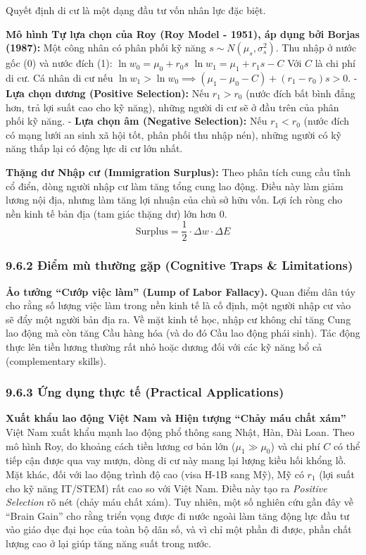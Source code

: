 \documentclass[
]{article}
\begin{document}
Quyết định di cư là một dạng đầu tư vốn nhân lực đặc biệt.

\textbf{Mô hình Tự lựa chọn của Roy (Roy Model - 1951), áp dụng bởi
Borjas (1987):} Một công nhân có phân phối kỹ năng
\(s \sim N(\mu_s, \sigma_s^2)\). Thu nhập ở nước gốc (0) và nước đích
(1): \(\ln w_0 = \mu_0 + r_0 s\) \(\ln w_1 = \mu_1 + r_1 s - C\) Với
\(C\) là chi phí di cư. Cá nhân di cư nếu
\(\ln w_1 > \ln w_0 \implies (\mu_1 - \mu_0 - C) + (r_1 - r_0)s > 0\). -
\textbf{Lựa chọn dương (Positive Selection):} Nếu \(r_1 > r_0\) (nước
đích bất bình đẳng hơn, trả lợi suất cao cho kỹ năng), những người di cư
sẽ ở đầu trên của phân phối kỹ năng. - \textbf{Lựa chọn âm (Negative
Selection):} Nếu \(r_1 < r_0\) (nước đích có mạng lưới an sinh xã hội
tốt, phân phối thu nhập nén), những người có kỹ năng thấp lại có động
lực di cư lớn nhất.

\textbf{Thặng dư Nhập cư (Immigration Surplus):} Theo phân tích cung cầu
tĩnh cổ điển, dòng người nhập cư làm tăng tổng cung lao động. Điều này
làm giảm lương nội địa, nhưng làm tăng lợi nhuận của chủ sở hữu vốn. Lợi
ích ròng cho nền kinh tế bản địa (tam giác thặng dư) lớn hơn 0.
\[ \text{Surplus} = \frac{1}{2} \cdot \Delta w \cdot \Delta E \]

\subsubsection{9.6.2 Điểm mù thường gặp (Cognitive Traps \&
Limitations)}\label{ux111iux1ec3m-muxf9-thux1b0ux1eddng-gux1eb7p-cognitive-traps-limitations-74}

\textbf{Ảo tưởng ``Cướp việc làm'' (Lump of Labor Fallacy).} Quan điểm
dân túy cho rằng số lượng việc làm trong nền kinh tế là cố định, một
người nhập cư vào sẽ đẩy một người bản địa ra. Về mặt kinh tế học, nhập
cư không chỉ tăng Cung lao động mà còn tăng Cầu hàng hóa (và do đó Cầu
lao động phái sinh). Tác động thực lên tiền lương thường rất nhỏ hoặc
dương đối với các kỹ năng bổ cả (complementary skills).

\subsubsection{9.6.3 Ứng dụng thực tế (Practical
Applications)}\label{ux1ee9ng-dux1ee5ng-thux1ef1c-tux1ebf-practical-applications-38}

\textbf{Xuất khẩu lao động Việt Nam và Hiện tượng ``Chảy máu chất xám''}
Việt Nam xuất khẩu mạnh lao động phổ thông sang Nhật, Hàn, Đài Loan.
Theo mô hình Roy, do khoảng cách tiền lương cơ bản lớn
(\(\mu_1 \gg \mu_0\)) và chi phí \(C\) có thể tiếp cận được qua vay
mượn, dòng di cư này mang lại lượng kiều hối khổng lồ. Mặt khác, đối với
lao động trình độ cao (visa H-1B sang Mỹ), Mỹ có \(r_1\) (lợi suất cho
kỹ năng IT/STEM) rất cao so với Việt Nam. Điều này tạo ra \emph{Positive
Selection} rõ nét (chảy máu chất xám). Tuy nhiên, một số nghiên cứu gần
đây về ``Brain Gain'' cho rằng triển vọng được đi nước ngoài làm tăng
động lực đầu tư vào giáo dục đại học của toàn bộ dân số, và vì chỉ một
phần đi được, phần chất lượng cao ở lại giúp tăng năng suất trong nước.
\end{document}
